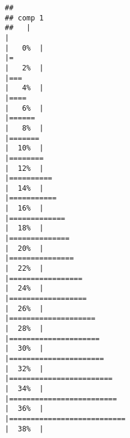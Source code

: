\documentclass[
]{article}
\begin{document}
\begin{verbatim}
## 
## comp 1 
##   |                                                                              |                                                                      |   0%  |                                                                              |=                                                                     |   2%  |                                                                              |===                                                                   |   4%  |                                                                              |====                                                                  |   6%  |                                                                              |======                                                                |   8%  |                                                                              |=======                                                               |  10%  |                                                                              |========                                                              |  12%  |                                                                              |==========                                                            |  14%  |                                                                              |===========                                                           |  16%  |                                                                              |=============                                                         |  18%  |                                                                              |==============                                                        |  20%  |                                                                              |===============                                                       |  22%  |                                                                              |=================                                                     |  24%  |                                                                              |==================                                                    |  26%  |                                                                              |====================                                                  |  28%  |                                                                              |=====================                                                 |  30%  |                                                                              |======================                                                |  32%  |                                                                              |========================                                              |  34%  |                                                                              |=========================                                             |  36%  |                                                                              |===========================                                           |  38%  |                                                                          
\end{verbatim}
\end{document}
